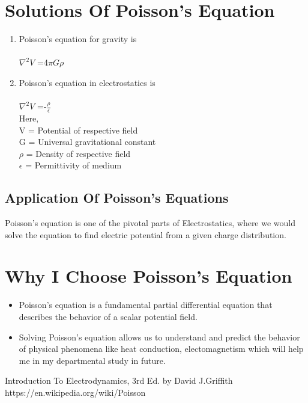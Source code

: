\documentclass{article}
\begin{document}
\section{Solutions Of Poisson's Equation}
\begin{enumerate}
    \item Poisson's equation for gravity is \\\\
    \indent\hspace{2cm} $\nabla^2V$ =4$\pi$$G$$\rho$
    \item  Poisson's equation in electrostatics is \\\\
    \indent\hspace{2cm} $\nabla^2V$ =-$\frac{\rho}{\epsilon}$\\
    Here,\\
    \indent\hspace{1cm} V = Potential of respective field \\
    \indent\hspace{1cm} G = Universal gravitational constant \\
    \indent\hspace{1cm} $\rho$ = Density of respective field \\
    \indent\hspace{1cm} $\epsilon$ = Permittivity of medium \\
\end{enumerate}


\subsection{Application Of Poisson's Equations}
Poisson's equation is one of the pivotal parts of Electrostatics, where we would solve the equation to find electric potential from a given charge distribution.

\section{Why I Choose Poisson's Equation}

\begin{itemize}
    \item  Poisson's equation is a fundamental partial differential equation that describes the behavior of a scalar potential field.
    \item  Solving Poisson's equation allows us to understand and predict the behavior of physical phenomena like heat conduction, electomagnetism  which will help me in my departmental study in future.
\end{itemize}

\begin{thebibliography}{2}
Introduction To Electrodynamics, 3rd Ed. by David J.Griffith
https://en.wikipedia.org/wiki/Poisson%
\end{thebibliography}
\end{document}
